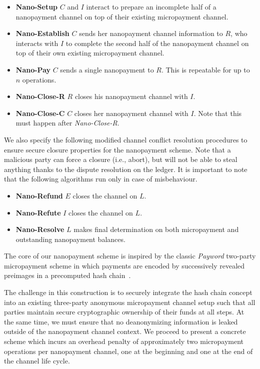 \begin{itemize}
\item \textbf{Nano-Setup} $C$ and $I$ interact to prepare an incomplete half of
  a nanopayment channel on top of their existing micropayment channel.
\item \textbf{Nano-Establish} $C$ sends her nanopayment channel information to
  $R$, who interacts with $I$ to complete the second half of the nanopayment
  channel on top of their own existing micropayment channel.
\item \textbf{Nano-Pay} $C$ sends a single nanopayment to $R$. This is
  repeatable for up to $n$ operations.
\item \textbf{Nano-Close-R} $R$ closes his nanopayment channel with $I$.
\item \textbf{Nano-Close-C} $C$ closes her nanopayment channel with $I$. Note that
  this must happen after \emph{Nano-Close-R}.
\end{itemize}

We also specify the following modified channel conflict resolution procedures to
ensure secure closure properties for the nanopayment scheme. Note that a malicious party can force a closure (i.e., abort), but will not be able to steal anything thanks to the dispute resolution on the ledger. It is important to note that the following algorithms run only in case of misbehaviour.

\begin{itemize}
\item \textbf{Nano-Refund} $E$ closes the channel on $L$.
\item \textbf{Nano-Refute} $I$ closes the channel on $L$.
\item \textbf{Nano-Resolve} $L$ makes final determination on both micropayment and
  outstanding nanopayment balances.
\end{itemize}

The core of our nanopayment scheme is inspired by the classic \emph{Payword}
two-party micropayment scheme in which payments are encoded by successively
revealed preimages in a precomputed hash chain~\cite{rivest1996payword}. 

The challenge in this construction is to securely integrate the hash chain
concept into an existing three-party anonymous micropayment channel setup such
that all parties maintain secure cryptographic ownership of their funds at all
steps. At the same time, we must ensure that no deanonymizing information is
leaked outside of the nanopayment channel context. We proceed to present a
concrete scheme which incurs an overhead penalty of approximately two
micropayment operations per nanopayment channel, one at the beginning and one at
the end of the channel life cycle.

